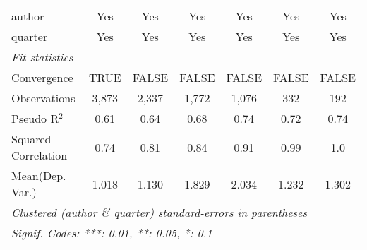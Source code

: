 \begin{tabular}{lcccccc}
   author                                                     & Yes           & Yes          & Yes           & Yes           & Yes           & Yes\\  
   quarter                                                    & Yes           & Yes          & Yes           & Yes           & Yes           & Yes\\  
   \midrule
   \emph{Fit statistics}\\
   Convergence                                                &TRUE           & FALSE        & FALSE         & FALSE         & FALSE         & FALSE\\  
   Observations                                               & 3,873         & 2,337        & 1,772         & 1,076         & 332           & 192\\  
   Pseudo R$^2$                                               & 0.61          & 0.64         & 0.68          & 0.74          & 0.72          & 0.74\\  
   Squared Correlation                                        & 0.74          & 0.81         & 0.84          & 0.91          & 0.99          & 1.0\\  
Mean(Dep. Var.) & 1.018 & 1.130 & 1.829 & 2.034 & 1.232 & 1.302 \\
   \midrule \midrule
   \multicolumn{7}{l}{\emph{Clustered (author \& quarter) standard-errors in parentheses}}\\
   \multicolumn{7}{l}{\emph{Signif. Codes: ***: 0.01, **: 0.05, *: 0.1}}\\
\end{tabular}
\par\endgroup
